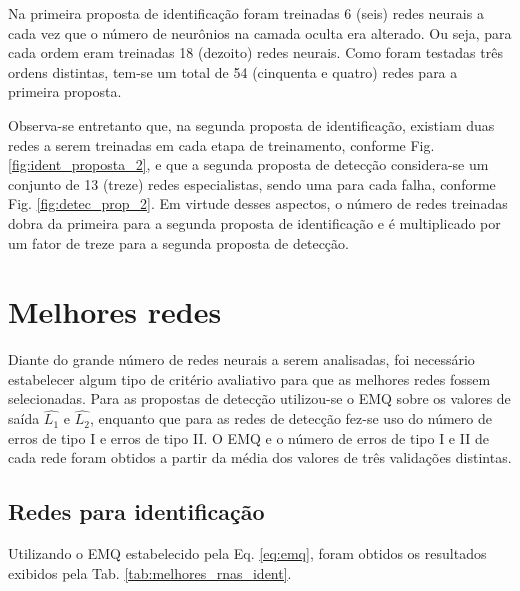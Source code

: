 Na primeira proposta de identificação foram treinadas 6 (seis) redes neurais a
cada vez que o número de neurônios na camada oculta era alterado. Ou seja, para
cada ordem eram treinadas 18 (dezoito) redes neurais.  Como foram testadas três
ordens distintas, tem-se um total de 54 (cinquenta e quatro) redes para a
primeira proposta.

Observa-se entretanto que, na segunda proposta de identificação, existiam duas
redes a serem treinadas em cada etapa de treinamento, conforme Fig.
\ref{fig:ident_proposta_2}, e que a segunda proposta de detecção considera-se um
conjunto de 13 (treze) redes especialistas, sendo uma para cada falha, conforme
Fig. \ref{fig:detec_prop_2}. Em virtude desses aspectos, o número de redes
treinadas dobra da primeira para a segunda proposta de identificação e é
multiplicado por um fator de treze para a segunda proposta de detecção.

\section{Melhores redes}
Diante do grande número de redes neurais a serem analisadas, foi necessário
estabelecer algum tipo de critério avaliativo para que as melhores redes fossem
selecionadas. Para as propostas de detecção utilizou-se o EMQ sobre os valores
de saída $\widehat{L_1}$ e $\widehat{L_2}$, enquanto que para as redes de
detecção fez-se uso do número de erros de tipo I e erros de tipo II.  O EMQ e o
número de erros de tipo I e II de cada rede foram obtidos a partir da média dos
valores de três validações distintas.

\subsection{Redes para identificação}
Utilizando o EMQ estabelecido pela Eq. \ref{eq:emq}, foram obtidos os resultados
exibidos pela Tab. \ref{tab:melhores_rnas_ident}.

